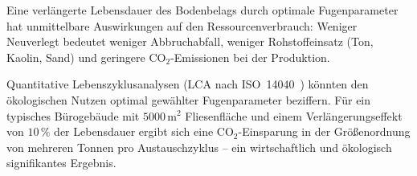 ﻿\documentclass[a4paper,12pt]{article}
\theoremstyle{definition}
\begin{document}
Eine verlängerte Lebensdauer des Bodenbelags durch optimale Fugenparameter
hat unmittelbare Auswirkungen auf den Ressourcenverbrauch: Weniger
Neuverlegt bedeutet weniger Abbruchabfall, weniger Rohstoffeinsatz
(Ton, Kaolin, Sand) und geringere CO$_2$-Emissionen bei der Produktion.

Quantitative Lebenszyklusanalysen (LCA nach ISO~14040~\cite{iso14040})
könnten den ökologischen Nutzen optimal gewählter Fugenparameter
beziffern. Für ein typisches Bürogebäude mit $5000\,\text{m}^2$
Fliesenfläche und einem Verlängerungseffekt von $10\,\%$ der
Lebensdauer ergibt sich eine CO$_2$-Einsparung in der Größenordnung
von mehreren Tonnen pro Austauschzyklus -- ein wirtschaftlich und
ökologisch signifikantes Ergebnis.

\end{document}
